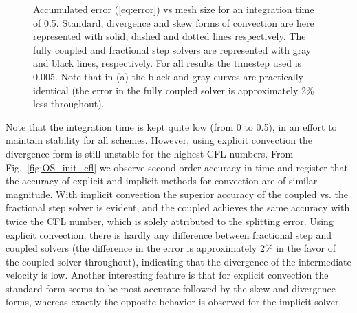 \begin{figure}
 \centering
 \caption{Accumulated error (\ref{eq:error}) vs mesh size for an integration time of 0.5. Standard, divergence and skew forms of convection are here represented with solid, dashed and dotted lines respectively. The fully coupled and fractional step solvers are represented with gray and black lines, respectively. For all results the timestep used is 0.005. Note that in (a) the black and gray curves are practically identical (the error in the fully coupled solver is approximately 2\% less throughout). }
\label{fig:OS_init_dx}
\end{figure}
Note that the integration time is kept quite low (from 0 to 0.5), in an effort to maintain stability for all schemes. However, using explicit convection the divergence form is still unstable for the highest CFL numbers. From Fig.~\ref{fig:OS_init_cfl} we observe second order accuracy in time and register that the accuracy of explicit and implicit methods for convection are of similar magnitude. With implicit convection the superior accuracy of the coupled vs. the fractional step solver is evident, and the coupled achieves the same accuracy with twice the CFL number, which is solely attributed to the splitting error. Using explicit convection, there is hardly any difference between fractional step and coupled solvers (the difference in the error is approximately 2\% in the favor of the coupled solver throughout), indicating that the divergence of the intermediate velocity is low. Another interesting feature is that for explicit convection the standard form seems to be most accurate followed by the skew and divergence forms, whereas exactly the opposite behavior is observed for the implicit solver.

